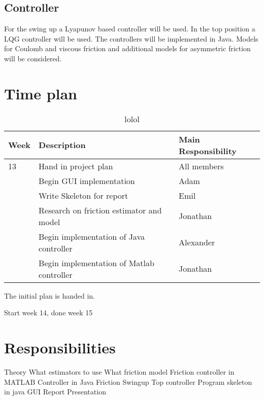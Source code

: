 \documentclass[10pt,a4paper]{article}
\begin{document}

\subsection{Controller}
For the swing up a Lyapunov based controller will be used. In the top position a LQG controller will be used. The controllers will be implemented in Java.
Models for Coulomb and viscous friction and additional models for asymmetric friction will be considered. 

\section{Time plan}
\begin{table}[]
\centering
\caption{lolol}
\label{hoho}
\begin{tabular}{|l|l|l|}
\hline
Week & Description & Main Responsibility \\ \hline
13 & Hand in project plan & All members \\ \hline
& Begin GUI implementation & Adam \\ \hline
& Write Skeleton for report & Emil \\ \hline
& Research on friction estimator and model & Jonathan \\ \hline
& Begin implementation of Java controller & Alexander \\ \hline
& Begin implementation of Matlab controller & Jonathan \\ \hline

\end{tabular}
\end{table}
The initial plan is handed in.


Start week 14, done week 15

\section{Responsibilities}
Theory
	What estimators to use
	What friction model
Friction controller in MATLAB
Controller in Java
	Friction
	Swingup
	Top controller
Program skeleton in java
GUI
Report
Presentation
\end{document}

